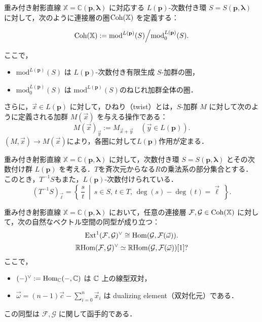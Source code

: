 \begin{defn}\cite{GL87}
重み付き射影直線 $\mathbb{X} = \mathbb{C}(\mathbf{p}, \boldsymbol{\lambda})$ に対応する $L(\mathbf{p})$-次数付き環 $S = S(\mathbf{p}, \boldsymbol{\lambda})$ に対して，次のように連接層の圏$\operatorname{\mathrm{Coh}}(\mathbb{X})$ を定義する：

\[
\operatorname{\mathrm{Coh}}(\mathbb{X}) := \mathrm{mod}^{L(\mathbf{p})}(S)\Big{/}\mathrm{mod}^{L(\mathbf{p})}_0(S).
\]

ここで，
\begin{itemize}
  \item $\mathrm{mod}^{L(\mathbf{p})}(S)$ は $L(\mathbf{p})$-次数付き有限生成 $S$-加群の圏，
	\item $\mathrm{mod}^{L(\mathbf{p})}_0(S)$ は $\mathrm{mod}^{L(\mathbf{p})}(S)$のねじれ加群全体の圏．
\end{itemize}
さらに，$\vec{x} \in L(\mathbf{p})$ に対して，ひねり（twist）とは，$S$-加群 $M$ に対して次のように定義される加群 $M(\vec{x})$ を与える操作である：
\[
M(\vec{x})_{\vec{y}} := M_{\vec{x} + \vec{y}} \quad (\vec{y} \in L(\mathbf{p})).
\]
$(M,\vec{x})\to M(\vec{x})$により，各圏に対して$L(\mathbf{p})$作用が定まる．
\end{defn}

\begin{defn}[局所化]
	重み付き射影直線 $\mathbb{X} = \mathbb{C}(\mathbf{p}, \boldsymbol{\lambda})$ に対して，次数付き環 $S = S(\mathbf{p}, \boldsymbol{\lambda})$ とその次数付け群 $L(\mathbf{p})$ を考える．$T$を斉次元からなる$R$の乗法系の部分集合とする．このとき，$T^{-1}S$もまた，$L(\mathbf{p})$-次数付けられている．
	\[(T^{-1}S)_{\vec{\ell}} = \left\{\,\frac{s}{t}\ \middle |\ s\in S,\, t\in T,\, \deg(s)-\deg(t)=\vec{\ell}\ \right\}.\]
\end{defn}

\begin{thm}\cite{GL87}
重み付き射影直線 $\mathbb{X} = \mathbb{C}(\mathbf{p}, \boldsymbol{\lambda})$ において，任意の連接層 $\mathcal{F}, \mathcal{G} \in \operatorname{\mathrm{Coh}}(\mathbb{X})$ に対して，次の自然なベクトル空間の同型が成り立つ：
\[
\operatorname{\mathrm{Ext}}^1(\mathcal{F}, \mathcal{G})^\vee \cong \operatorname{\mathrm{Hom}}(\mathcal{G}, \mathcal{F}(\vec{\omega})).
\]
\[
\operatorname{\mathbb{R}\mathrm{Hom}}({\mathcal F},{\mathcal G})^\vee \simeq \operatorname{\mathbb{R}\mathrm{Hom}}({\mathcal G},{\mathcal F}(\vec{\omega}))[1]?\]
ここで，
\begin{itemize}
	\item $(-)^\vee := \operatorname{\mathrm{Hom}}_{{\mathbb C}}(-, {\mathbb C})$ は ${\mathbb C}$ 上の線型双対，
  \item $\vec{\omega} = (n - 1)\vec{c} - \sum_{i=0}^n \vec{x}_i$ は dualizing element（双対化元）である．
\end{itemize}
この同型は $\mathcal{F}, \mathcal{G}$ に関して函手的である．
\end{thm}

